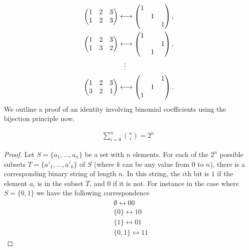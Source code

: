 \begin{align*}
    &\begin{pmatrix}
    1 & 2 & 3 \\
    1 & 2 & 3 
\end{pmatrix}
\longleftrightarrow
\begin{pmatrix}
    1&& \\
    &1& \\
    &&1
\end{pmatrix}, \\
&\begin{pmatrix}
    1 & 2 & 3 \\
    1 & 3 & 2 
\end{pmatrix}
\longleftrightarrow
\begin{pmatrix}
    1&& \\
    &&1 \\
    &1&
\end{pmatrix}, \\
&\hspace*{6em}\vdots \\
&\begin{pmatrix}
    1 & 2 & 3 \\
    3 & 2 & 1
\end{pmatrix}
\longleftrightarrow
\begin{pmatrix}
    &&1\\
    &1&\\
    1&&
\end{pmatrix}.
\end{align*}
We outline a proof of an identity involving binomial coefficients using the bijection principle now.
\begin{claim}
\begin{align*}
\sum_{i=0}^{n}\binom{n}{i} = 2^n
\end{align*}
\label{c:2.1}
\end{claim}
\begin{proof}
	Let \( S = \{a_1, \ldots, a_n\} \) be a set with \( n \) elements. For each of the \( 2^n \) possible subsets \( T = \{a'_1, \ldots, a'_k\} \) of \( S \) (where \( k \) can be any value from 0 to \( n \)), there is a corresponding binary string of length \( n \). In this string, the \( i \)th bit is \( 1 \) if the element \( a_i \) is in the subset \( T \), and \( 0 \) if it is not. For instance in the case where $S=\{0,1\}$ we have the following correspondence
	 \begin{align*}
		&\emptyset \longleftrightarrow 00 \\
		&\{0\} \longleftrightarrow 10 \\
		&\{1\} \longleftrightarrow 01 \\
		&\{0,1\} \longleftrightarrow 11
	\end{align*}
\end{proof}
